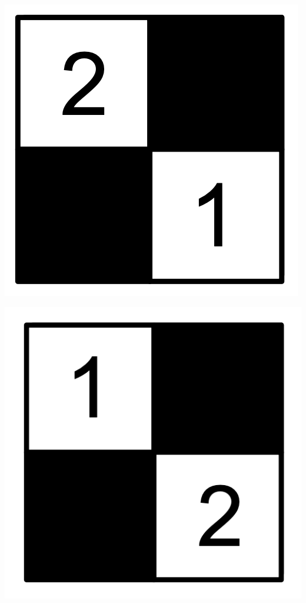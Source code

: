 \documentclass{book}
\theoremstyle{definition}
\begin{document}
\begin{center}
\includegraphics[scale=1]{r1.png}
\end{center}

\begin{center}
\includegraphics[scale=1]{r2.png}
\end{center}
\end{document}
